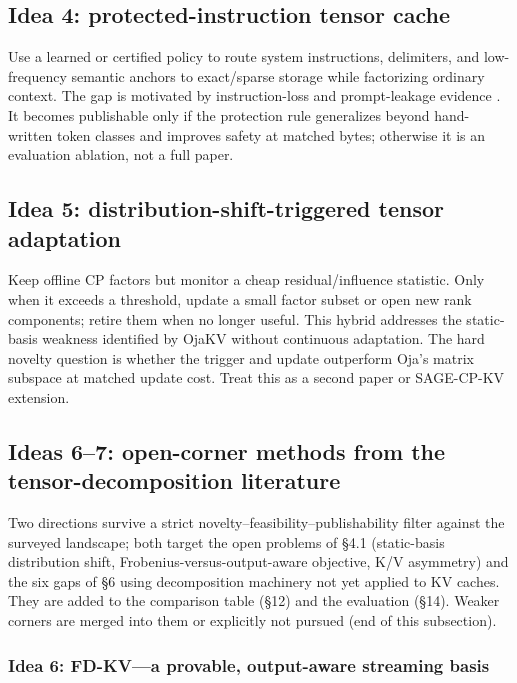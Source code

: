 \documentclass[10pt]{article}
\begin{document}
\subsection{Idea 4: protected-instruction tensor cache}

Use a learned or certified policy to route system instructions, delimiters, and low-frequency
semantic anchors to exact/sparse storage while factorizing ordinary context. The gap is motivated
by instruction-loss and prompt-leakage evidence \cite{pitfalls}. It becomes publishable only if the
protection rule generalizes beyond hand-written token classes and improves safety at matched bytes;
otherwise it is an evaluation ablation, not a full paper.

\subsection{Idea 5: distribution-shift-triggered tensor adaptation}

Keep offline CP factors but monitor a cheap residual/influence statistic. Only when it exceeds a
threshold, update a small factor subset or open new rank components; retire them when no longer
useful. This hybrid addresses the static-basis weakness identified by OjaKV without continuous
adaptation. The hard novelty question is whether the trigger and update outperform Oja's matrix
subspace at matched update cost. Treat this as a second paper or SAGE-CP-KV extension.

\subsection{Ideas 6--7: open-corner methods from the tensor-decomposition literature}

Two directions survive a strict novelty--feasibility--publishability filter against the surveyed
landscape; both target the open problems of \S4.1 (static-basis distribution shift,
Frobenius-versus-output-aware objective, K/V asymmetry) and the six gaps of \S6 using decomposition
machinery not yet applied to KV caches. They are added to the comparison table (\S12) and the
evaluation (\S14). Weaker corners are merged into them or explicitly not pursued (end of this
subsection).

\subsubsection*{Idea 6: FD-KV---a provable, output-aware streaming basis}
\end{document}
